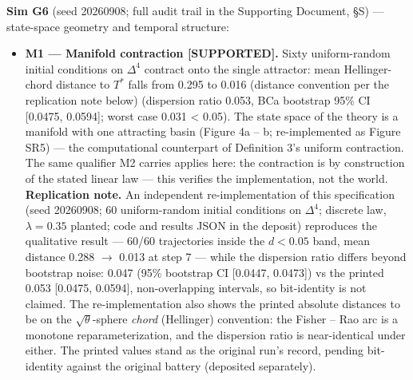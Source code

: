 \documentclass[
]{article}
\begin{document}
\textbf{Sim G6} (seed 20260908; full audit trail in the Supporting
Document, §S) --- state-space geometry and temporal structure:

\begin{itemize}
\item
  \textbf{M1 --- Manifold contraction {[}SUPPORTED{]}.} Sixty
  uniform-random initial conditions on \(\Delta^{4}\) contract onto the
  single attractor: mean Hellinger-chord distance to \(T^{*}\) falls
  from 0.295 to 0.016 (distance convention per the replication note
  below) (dispersion ratio 0.053, BCa bootstrap 95\% CI {[}0.0475,
  0.0594{]}; worst case 0.031 \textless{} 0.05). The state space of the
  theory is a manifold with one attracting basin (Figure 4a -- b;
  re-implemented as Figure SR5) --- the computational counterpart of
  Definition 3's uniform contraction. The same qualifier M2 carries
  applies here: the contraction is by construction of the stated linear
  law --- this verifies the implementation, not the world.
  \textbf{Replication note.} An independent re-implementation of this
  specification (seed 20260908; 60 uniform-random initial conditions on
  \(\Delta^{4}\); discrete law, \(\lambda = 0.35\) planted; code and
  results JSON in the deposit) reproduces the qualitative result ---
  60/60 trajectories inside the \(d < 0.05\) band, mean distance 0.288
  \(\to\) 0.013 at step 7 --- while the dispersion ratio differs beyond
  bootstrap noise: 0.047 (95\% bootstrap CI {[}0.0447, 0.0473{]}) vs the
  printed 0.053 {[}0.0475, 0.0594{]}, non-overlapping intervals, so
  bit-identity is not claimed. The re-implementation also shows the
  printed absolute distances to be on the \(\sqrt{\theta}\)-sphere
  \emph{chord} (Hellinger) convention: the Fisher -- Rao arc is a
  monotone reparameterization, and the dispersion ratio is
  near-identical under either. The printed values stand as the original
  run's record, pending bit-identity against the original battery
  (deposited separately).


\end{itemize}
\end{document}
